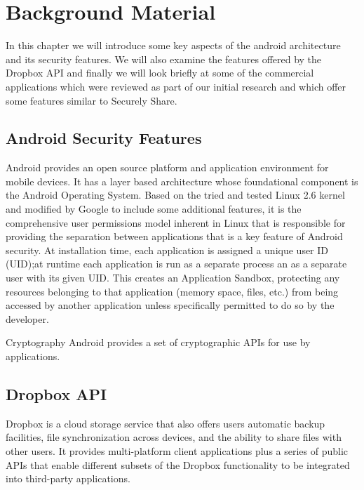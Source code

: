 
\chapter{Background Material}
\label{cha:background}

In this chapter we will introduce some key aspects of the android architecture and its security features.  We will also examine the features offered by the Dropbox API and finally we will look briefly at some of the commercial applications which were reviewed as part of our initial research and which offer some features similar to Securely Share.

\section{Android Security Features}

Android provides an open source platform and application environment for mobile devices.  It has a layer based architecture whose foundational component  is the Android Operating System.  Based on the tried and tested Linux 2.6 kernel and modified by Google to include some additional features, it is the comprehensive user permissions model inherent in Linux that is responsible for providing the separation between applications that is a key feature of Android security.  At installation time, each application is assigned a unique user ID (UID);at runtime each application is run as a separate process an as a separate user with its given UID. This creates an Application Sandbox, protecting any resources belonging to that application (memory space, files, etc.) from being accessed by another application unless specifically permitted to do so by the developer.







Cryptography
Android provides a set of cryptographic APIs for use by applications. 















\section{Dropbox API}
\label{sec:dropbox}
Dropbox is a cloud storage service that also offers users  automatic backup facilities, file synchronization across devices, and the ability to share files with other users.  It provides multi-platform client applications plus a series of public APIs that enable different subsets of the Dropbox functionality to be integrated into third-party applications.  

